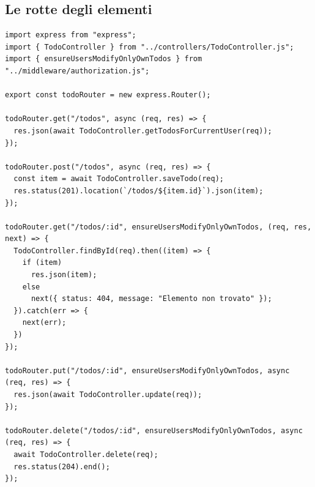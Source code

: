 \subsection{Le rotte degli elementi}

\begin{lstlisting}[style=js, name=routes/todoRouter.js]
import express from "express";
import { TodoController } from "../controllers/TodoController.js";
import { ensureUsersModifyOnlyOwnTodos } from "../middleware/authorization.js";

export const todoRouter = new express.Router();

todoRouter.get("/todos", async (req, res) => {
  res.json(await TodoController.getTodosForCurrentUser(req));
});

todoRouter.post("/todos", async (req, res) => {
  const item = await TodoController.saveTodo(req);
  res.status(201).location(`/todos/${item.id}`).json(item);
});

todoRouter.get("/todos/:id", ensureUsersModifyOnlyOwnTodos, (req, res, next) => {
  TodoController.findById(req).then((item) => {
    if (item)
      res.json(item);
    else
      next({ status: 404, message: "Elemento non trovato" });
  }).catch(err => {
    next(err);
  })
});

todoRouter.put("/todos/:id", ensureUsersModifyOnlyOwnTodos, async (req, res) => {
  res.json(await TodoController.update(req));
});

todoRouter.delete("/todos/:id", ensureUsersModifyOnlyOwnTodos, async (req, res) => {
  await TodoController.delete(req);
  res.status(204).end();
});
\end{lstlisting}


